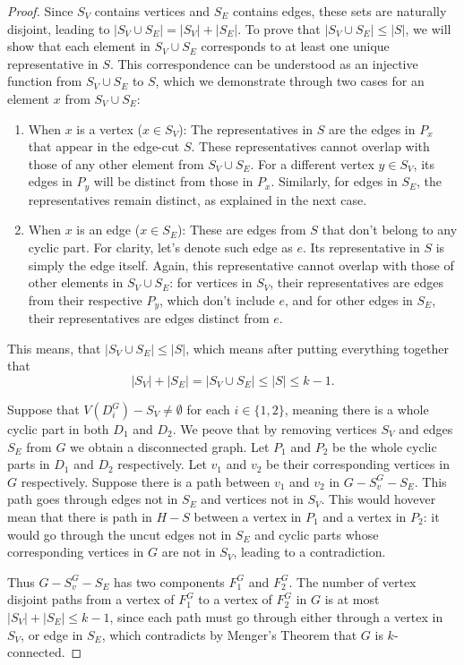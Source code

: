 \documentclass[12pt, twoside]{book}
\begin{document}
\begin{proof}
	Since $S_V$ contains vertices and $S_E$ contains edges, these sets are naturally disjoint, leading to $|S_V\cup S_E|=|S_V|+|S_E|$. To prove that $|S_V\cup S_E|\leq |S|$, we will show that each element in $S_V\cup S_E$ corresponds to at least one unique representative in $S$. This correspondence can be understood as an injective function from $S_V\cup S_E$ to $S$, which we demonstrate through two cases for an element $x$ from $S_V\cup S_E$:
	\begin{enumerate}
		\item When $x$ is a vertex ($x\in S_V$): The representatives in $S$ are the edges in $P_x$ that appear in the edge-cut $S$. These representatives cannot overlap with those of any other element from $S_V\cup S_E$. For a different vertex $y\in S_V$, its edges in $P_y$ will be distinct from those in $P_x$. Similarly, for edges in $S_E$, the representatives remain distinct, as explained in the next case.
		\item When $x$ is an edge ($x\in S_E$): These are edges from $S$ that don't belong to any cyclic part. For clarity, let's denote such edge as $e$. Its representative in $S$ is simply the edge itself. Again, this representative cannot overlap with those of other elements in $S_V\cup S_E$: for vertices in $S_V$, their representatives are edges from their respective $P_y$, which don't include $e$, and for other edges in $S_E$, their representatives are edges distinct from $e$.
	\end{enumerate} 
	
	This means, that $|S_V\cup S_E|\leq |S|$, which means after putting everything together that $$|S_V|+|S_E|=|S_V\cup S_E|\leq |S|\leq k-1.$$
	
	Suppose that $V(D_i^G)-S_V\neq\emptyset$ for each $i\in \{1,2\}$, meaning there is a whole cyclic part in both $D_1$ and $D_2$. We peove that by removing vertices $S_V$ and edges $S_E$ from $G$ we obtain a disconnected graph. Let $P_1$ and $P_2$ be the whole cyclic parts in $D_1$ and $D_2$ respectively. Let $v_1$ and $v_2$ be their corresponding vertices in $G$ respectively. Suppose there is a path between $v_1$ and $v_2$ in $G-S_v^G-S_E$. This path goes through edges not in $S_E$ and vertices not in $S_V$. This would hovever mean that there is path in $H-S$ between a vertex in $P_1$ and a vertex in $P_2$: it would go through the uncut edges not in $S_E$ and cyclic parts whose corresponding vertices in $G$ are not in $S_V$, leading to a contradiction.
	
	Thus $G-S_v^G-S_E$ has two components $F_1^G$ and $F_2^G$. The number of vertex disjoint paths from a vertex of $F_1^G$ to a vertex of $F_2^G$ in $G$ is at most $|S_V|+|S_E|\leq k-1$, since each path must go through either through a vertex in $S_V$, or edge in $S_E$, which contradicts by Menger's Theorem that $G$ is $k$-connected.
	

\end{proof}
\end{document}
